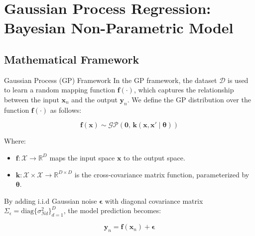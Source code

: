 \section{Gaussian Process Regression: Bayesian Non-Parametric Model}

\subsection{Mathematical Framework}
\begin{frame}{Gaussian Process (GP) Framework}
	\justifying
	In the GP framework, the dataset $\mathcal{D}$ is used to learn a random mapping function $\bm{f}(\cdot)$, which captures the relationship between the input $\bm{x}_n$ and the output $\bm{y}_n$. We define the GP distribution over the function $\bm{f}(\cdot)$ as follows:
	
	\begin{equation*}
		\bm{f}(\bm{x}) \sim \mathcal{GP}\left(\bm{0},\, \bm{k}(\bm{x}, \bm{x}' \mid \bm{\theta})\right)
	\end{equation*}
	
	\vspace{5mm} %
	
	Where:
	\begin{itemize}
		\item $\bm{f}: \mathcal{X} \rightarrow \mathbb{R}^D$ maps the input space $\bm{x}$ to the output space.
		\item $\bm{k}: \mathcal{X} \times \mathcal{X} \rightarrow \mathbb{R}^{D \times D}$ is the cross-covariance matrix function, parameterized by $\bm{\theta}$.
	\end{itemize}
	
	\vspace{5mm} %
	
	By adding i.i.d Gaussian noise $\bm{\epsilon}$ with diagonal covariance matrix $\Sigma_\epsilon = \text{diag}\{\sigma^2_{Nd}\}_{d=1}^D$, the model prediction becomes:
	
	\begin{equation*}
		\bm{y}_n = \bm{f}(\bm{x}_n) + \bm{\epsilon}
	\end{equation*}
\end{frame}

